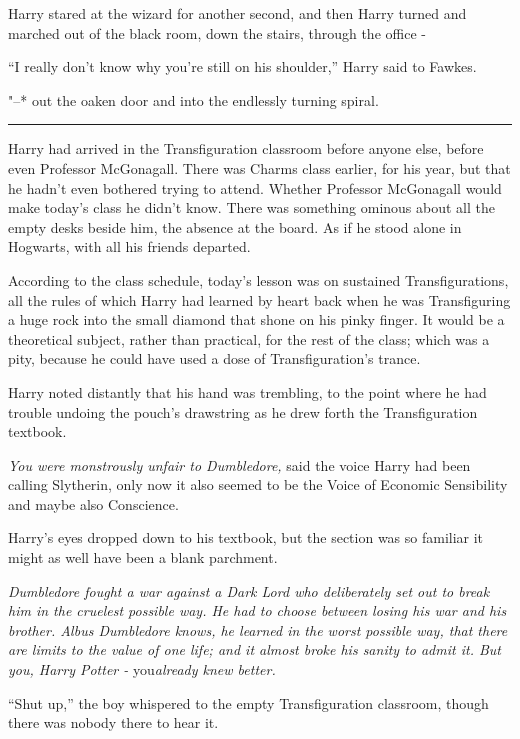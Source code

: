 Harry stared at the wizard for another second, and then Harry turned and
marched out of the black room, down the stairs, through the office -

``I really don't know why you're still on his shoulder,'' Harry said to
Fawkes.

"--* out the oaken door and into the endlessly turning spiral.

\begin{center}\rule{3in}{0.4pt}\end{center}

Harry had arrived in the Transfiguration classroom before anyone else,
before even Professor McGonagall. There was Charms class earlier, for
his year, but that he hadn't even bothered trying to attend. Whether
Professor McGonagall would make today's class he didn't know. There was
something ominous about all the empty desks beside him, the absence at
the board. As if he stood alone in Hogwarts, with all his friends
departed.

According to the class schedule, today's lesson was on sustained
Transfigurations, all the rules of which Harry had learned by heart back
when he was Transfiguring a huge rock into the small diamond that shone
on his pinky finger. It would be a theoretical subject, rather than
practical, for the rest of the class; which was a pity, because he could
have used a dose of Transfiguration's trance.

Harry noted distantly that his hand was trembling, to the point where he
had trouble undoing the pouch's drawstring as he drew forth the
Transfiguration textbook.

\emph{You were monstrously unfair to Dumbledore,} said the voice Harry
had been calling Slytherin, only now it also seemed to be the Voice of
Economic Sensibility and maybe also Conscience.

Harry's eyes dropped down to his textbook, but the section was so
familiar it might as well have been a blank parchment.

\emph{Dumbledore fought a war against a Dark Lord who deliberately set
out to break him in the cruelest possible way. He had to choose between
losing his war and his brother. Albus Dumbledore knows, he learned in
the worst possible way, that there are limits to the value of one life;
and it almost broke his sanity to admit it. But you, Harry Potter -}
you\emph{already knew better.}

``Shut up,'' the boy whispered to the empty Transfiguration classroom,
though there was nobody there to hear it.

